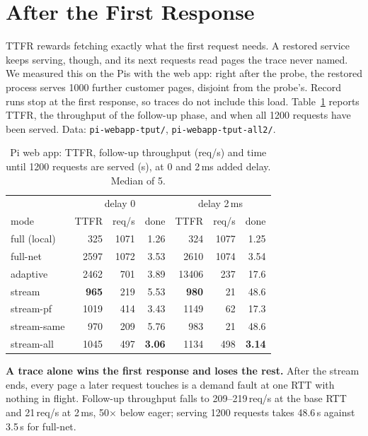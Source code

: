 \documentclass[conference]{IEEEtran}
\newcommand{\mode}[1]{\textsf{#1}}
\begin{document}
\section{After the First Response}
\label{sec:after}

TTFR rewards fetching exactly what the first request needs. A restored
service keeps serving, though, and its next requests read pages the trace
never named. We measured this on the Pis with the web app: right after the
probe, the restored process serves 1000 further customer pages, disjoint
from the probe's. Record runs stop at the first response, so traces do not
include this load. Table~\ref{tab:after} reports TTFR, the throughput of
the follow-up phase, and when all 1200 requests have been served.
{Data: \texttt{pi-webapp-tput/}, \texttt{pi-webapp-tput-all2/}.}

\begin{table}[t]
\centering
\caption{Pi web app: TTFR, follow-up throughput (req/s) and time until 1200
requests are served (s), at 0 and 2\,ms added delay. Median of 5.}
\label{tab:after}
\setlength{\tabcolsep}{3.5pt}
\begin{tabular}{@{}l|rrr|rrr@{}}
\toprule
 & \multicolumn{3}{c|}{delay 0} & \multicolumn{3}{c}{delay 2\,ms} \\
mode & TTFR & req/s & done & TTFR & req/s & done \\
\midrule
full (local) & 325 & 1071 & 1.26 & 324 & 1077 & 1.25 \\
full-net & 2597 & 1072 & 3.53 & 2610 & 1074 & 3.54 \\
adaptive & 2462 & 701 & 3.89 & 13406 & 237 & 17.6 \\
stream & \textbf{965} & 219 & 5.53 & \textbf{980} & 21 & 48.6 \\
stream-pf & 1019 & 414 & 3.43 & 1149 & 62 & 17.3 \\
stream-same & 970 & 209 & 5.76 & 983 & 21 & 48.6 \\
stream-all & 1045 & 497 & \textbf{3.06} & 1134 & 498 & \textbf{3.14} \\
\bottomrule
\end{tabular}
\end{table}

\textbf{A trace alone wins the first response and loses the rest.}
After the stream ends, every page a later request touches is a demand
fault at one RTT with nothing in flight. Follow-up throughput falls to
209--219\,req/s at the base RTT and 21\,req/s at 2\,ms, 50$\times$ below
eager; serving 1200 requests takes 48.6\,s against 3.5\,s for
\mode{full-net}.
\end{document}
